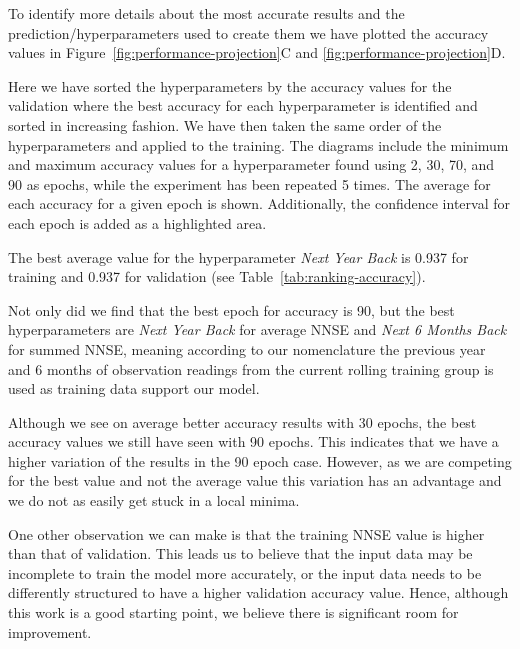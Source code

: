 \documentclass[utf8]{FrontiersinVancouver} %
\begin{document}
\begin{table}[htb]
\begin{center}
{\begin{tabular}{|l||r|r|l|r|r|l|}
        \hline
        \end{tabular}
        }
        \end{center}
        
\end{table}



        
To identify more details about the most accurate results and the
prediction/hyperparameters used to create them we have plotted the
accuracy values in Figure~\ref{fig:performance-projection}C and
\ref{fig:performance-projection}D.

Here we have sorted the hyperparameters by the accuracy values for the
validation where the best accuracy for each hyperparameter is
identified and sorted in increasing fashion. We have then taken the
same order of the hyperparameters and applied to the training.  The
diagrams include the minimum and maximum accuracy values for a
hyperparameter found using 2, 30, 70, and 90 as epochs, while the
experiment has been repeated 5 times. The average for each accuracy
for a given epoch is shown. Additionally, the confidence interval for
each epoch is added as a highlighted area.

The best average value for the hyperparameter {\em Next Year Back} is
0.937 for training and 0.937 for validation (see
Table~\ref{tab:ranking-accuracy}).

Not only did we find that the best epoch for accuracy is 90, but the
best hyperparameters are {\em Next Year Back} for average NNSE and
{\em Next 6 Months Back} for summed NNSE, meaning according to our
nomenclature the previous year and 6 months of observation readings
from the current rolling training group is used as training data
support our model.

Although we see on average better accuracy results with 30 epochs, the
best accuracy values we still have seen with 90 epochs. This indicates
that we have a higher variation of the results in the 90 epoch
case. However, as we are competing for the best value and not the
average value this variation has an advantage and we do not as easily
get stuck in a local minima.

One other observation we can make is that the training NNSE value is
higher than that of validation. This leads us to believe that the
input data may be incomplete to train the model more accurately, or
the input data needs to be differently structured to have a higher
validation accuracy value.  Hence, although this work is a good
starting point, we believe there is significant room for improvement.
\end{document}
